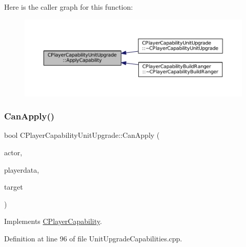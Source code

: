 Here is the caller graph for this function\+:\nopagebreak
\begin{figure}[H]
\begin{center}
\leavevmode
\includegraphics[width=350pt]{classCPlayerCapabilityUnitUpgrade_a8cc6fee17dd178fd798e36c3d5301e9d_icgraph}
\end{center}
\end{figure}
\hypertarget{classCPlayerCapabilityUnitUpgrade_a93d1a57f2cc52b90ce6cb714717bfefd}{}\label{classCPlayerCapabilityUnitUpgrade_a93d1a57f2cc52b90ce6cb714717bfefd} 
\subsubsection{\texorpdfstring{Can\+Apply()}{CanApply()}}
{\footnotesize\ttfamily bool C\+Player\+Capability\+Unit\+Upgrade\+::\+Can\+Apply (\begin{DoxyParamCaption}\item[{std\+::shared\+\_\+ptr$<$ \hyperlink{classCPlayerAsset}{C\+Player\+Asset} $>$}]{actor,  }\item[{std\+::shared\+\_\+ptr$<$ \hyperlink{classCPlayerData}{C\+Player\+Data} $>$}]{playerdata,  }\item[{std\+::shared\+\_\+ptr$<$ \hyperlink{classCPlayerAsset}{C\+Player\+Asset} $>$}]{target }\end{DoxyParamCaption})\hspace{0.3cm}{\ttfamily [virtual]}}



Implements \hyperlink{classCPlayerCapability_ae96263e0950f496492f8baeb877b9554}{C\+Player\+Capability}.



Definition at line 96 of file Unit\+Upgrade\+Capabilities.\+cpp.


